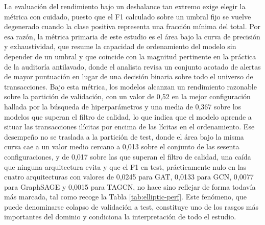La evaluación del rendimiento bajo un desbalance tan extremo exige elegir la métrica con cuidado, puesto que el F1 calculado sobre un umbral fijo se vuelve degenerado cuando la clase positiva representa una fracción mínima del total. Por esa razón, la métrica primaria de este estudio es el área bajo la curva de precisión y exhaustividad, que resume la capacidad de ordenamiento del modelo sin depender de un umbral y que coincide con la magnitud pertinente en la práctica de la auditoría antilavado, donde el analista revisa un conjunto acotado de alertas de mayor puntuación en lugar de una decisión binaria sobre todo el universo de transacciones. Bajo esta métrica, los modelos alcanzan un rendimiento razonable sobre la partición de validación, con un valor de 0,52 en la mejor configuración hallada por la búsqueda de hiperparámetros y una media de 0,367 sobre los modelos que superan el filtro de calidad, lo que indica que el modelo aprende a situar las transacciones ilícitas por encima de las lícitas en el ordenamiento. Ese desempeño no se traslada a la partición de test, donde el área bajo la misma curva cae a un valor medio cercano a 0,013 sobre el conjunto de las sesenta configuraciones, y de 0,017 sobre las que superan el filtro de calidad, una caída que ninguna arquitectura evita y que el F1 en test, prácticamente nulo en las cuatro arquitecturas con valores de 0,0245 para GAT, 0,0133 para GCN, 0,0077 para GraphSAGE y 0,0015 para TAGCN, no hace sino reflejar de forma todavía más marcada, tal como recoge la Tabla \ref{tab:elliptic-perf}. Este fenómeno, que puede denominarse colapso de validación a test, constituye uno de los rasgos más importantes del dominio y condiciona la interpretación de todo el estudio.




